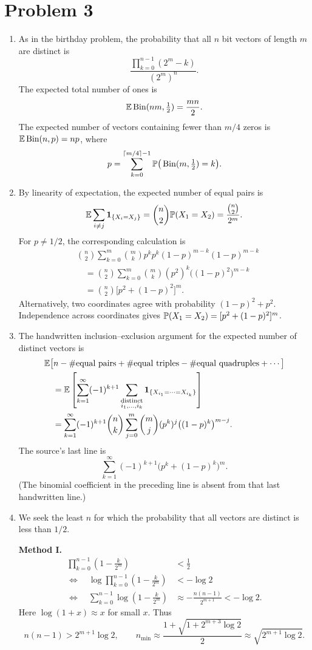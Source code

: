 \documentclass[a4paper]{article}
\begin{document}
\section*{Problem 3}
\begin{enumerate}
\item As in the birthday problem, the probability that all $n$ bit vectors
of length $m$ are distinct is
\[
\boxed{\frac{\prod_{k=0}^{n-1}(2^m-k)}{(2^m)^n}}.
\]
The expected total number of ones is
\[
\E\operatorname{Bin}(nm,\tfrac12)=\frac{mn}{2}.
\]
The expected number of vectors containing fewer than $m/4$ zeros is
$\E\operatorname{Bin}(n,p)=np$, where
\[
p=\sum_{k=0}^{\lceil m/4\rceil-1}
\P\big(\operatorname{Bin}(m,\tfrac12)=k\big).
\]
\item By linearity of expectation, the expected number of equal pairs is
\[
\E\sum_{i\ne j}\mathbf1_{\{X_i=X_j\}}
=\binom n2\P(X_1=X_2)=\frac{\binom n2}{2^m}.
\]
For $p\ne1/2$, the corresponding calculation is
\begin{align*}
&\binom n2\sum_{k=0}^m\binom mk
p^kp^k(1-p)^{m-k}(1-p)^{m-k}\\
&\quad=\binom n2\sum_{k=0}^m\binom mk
(p^2)^k\big((1-p)^2\big)^{m-k}\\
&\quad=\boxed{\binom n2\big[p^2+(1-p)^2\big]^m}.
\end{align*}
Alternatively, two coordinates agree with probability $(1-p)^2+p^2$.
Independence across coordinates gives
$\P(X_1=X_2)=[p^2+(1-p)^2]^m$.
\item The handwritten inclusion--exclusion argument for the expected number
of distinct vectors is
\begin{align*}
&\E\big[n-\#\text{equal pairs}+\#\text{equal triples}
-\#\text{equal quadruples}+\cdots\big]\\
&\quad=\E\left[\sum_{k=1}^{\infty}(-1)^{k+1}
\sum_{\substack{\text{distinct}\\i_1,\ldots,i_k}}
\mathbf1_{\{X_{i_1}=\cdots=X_{i_k}\}}\right]\\
&\quad=\sum_{k=1}^{\infty}(-1)^{k+1}\binom nk
\sum_{j=0}^{m}\binom mj(p^k)^j\big((1-p)^k\big)^{m-j}.
\end{align*}
The source's last line is
\[
\sum_{k=1}^{\infty}(-1)^{k+1}\big(p^k+(1-p)^k\big)^m.
\]
(The binomial coefficient in the preceding line is absent from that last
handwritten line.)
\item We seek the least $n$ for which the probability that all vectors are
distinct is less than $1/2$.

\textbf{Method I.}
\begin{align*}
\prod_{k=0}^{n-1}\left(1-\frac{k}{2^m}\right)&<\frac12\\
\Longleftrightarrow\quad
\log\prod_{k=0}^{n-1}\left(1-\frac{k}{2^m}\right)&<-\log2\\
\Longleftrightarrow\quad
\sum_{k=0}^{n-1}\log\left(1-\frac{k}{2^m}\right)
&\approx-\frac{n(n-1)}{2^{m+1}}<-\log2.
\end{align*}
Here $\log(1+x)\approx x$ for small $x$. Thus
\[
n(n-1)>2^{m+1}\log2,
\qquad
n_{\min}\approx\frac{1+\sqrt{1+2^{m+3}\log2}}2
\approx\sqrt{2^{m+1}\log2}.
\]


\end{enumerate}
\end{document}
